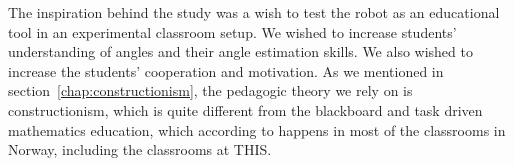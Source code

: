The inspiration behind the study was a wish to test the robot as an educational tool in an experimental classroom setup. We wished to increase students' understanding of angles and their angle estimation skills. We also wished to increase the students' cooperation and motivation. As we mentioned in section~\ref{chap:constructionism}, the pedagogic theory we rely on is constructionism, which is quite different from the blackboard and task driven mathematics education, which according to  happens in most of the classrooms in Norway, including the classrooms at THIS. %






